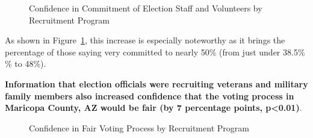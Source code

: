 \documentclass[
  11pt,
  a4paper,
]{article}
\begin{document}
\begin{figure}

\caption{\label{fig-q21-likert}Confidence in Commitment of Election
Staff and Volunteers by Recruitment Program}


\end{figure}%

As shown in Figure~\ref{fig-q21-likert}, this increase is especially
noteworthy as it brings the percentage of those saying very committed to
nearly 50\% (from just under 38.5\% \% to 48\%).

\textbf{Information that election officials were recruiting veterans and
military family members also increased confidence that the voting
process in Maricopa County, AZ would be fair (by 7 percentage points,
p\textless0.01)}.

\begin{figure}

\caption{\label{fig-q22-likert}Confidence in Fair Voting Process by
Recruitment Program}


\end{figure}%
\end{document}
